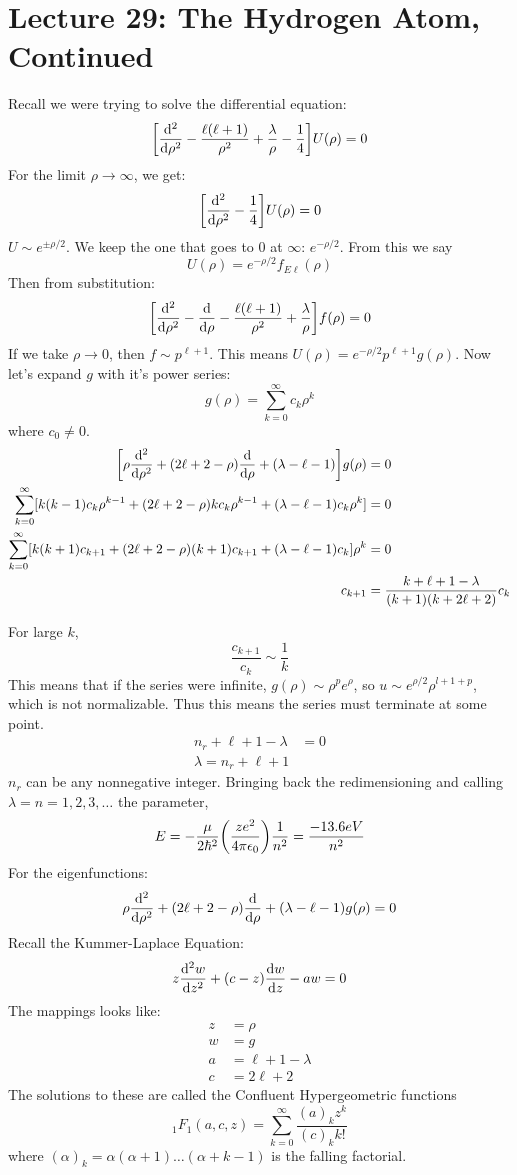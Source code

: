 \section{Lecture 29: The Hydrogen Atom, Continued}

Recall we were trying to solve the differential equation:
\[ \qty[\dv{^2}{\rho^2} - \frac{\ell(\ell + 1)}{\rho^2} + \frac{\lambda}{\rho} - \frac{1}{4}] U(\rho) = 0\]
For the limit $\rho \to \infty$, we get:
\[ \qty[\dv{^2}{\rho^2} - \frac{1}{4}] U(\rho) = 0 \]
$U \sim e^{\pm \rho/2}$. We keep the one that goes to 0 at $\infty$: $e^{-\rho /2}$. From this we say
\[ U(\rho) = e^{-\rho/2} f_{E\ell}(\rho) \]
Then from substitution:
\[ \qty[\dv{^2}{\rho^2} - \dv{}{\rho} - \frac{\ell(\ell + 1)}{\rho^2} + \frac{\lambda}{\rho}] f(\rho) = 0 \]
If we take $\rho \to 0$, then $f \sim p^{\ell + 1}$. This means $U(\rho) = e^{-\rho/2} p^{\ell + 1} g(\rho)$.
Now let's expand $g$ with it's power series:
\[ g(\rho) = \sum_{k = 0}^{\infty} c_k \rho^k \]
where $c_0 \neq 0$.
\begin{align*} 
    \qty[\rho \dv{^2}{\rho^2} + (2 \ell + 2 - \rho) \dv{}{\rho} + (\lambda - \ell - 1)]g(\rho) &= 0\\
    \sum_{k = 0}^{\infty} [k (k - 1) c_k \rho^{k - 1} + (2 \ell + 2 - \rho) k c_k \rho^{k - 1} + (\lambda - \ell - 1) c_k \rho^k] &= 0\\
    \sum_{k = 0}^{\infty} [ k(k + 1) c_{k + 1} + (2 \ell + 2 - \rho)(k + 1) c_{k + 1} + (\lambda - \ell - 1)c_k ]\rho^k &= 0 \\
    c_{k + 1} &= \frac{k + \ell + 1 - \lambda}{(k + 1) (k + 2\ell + 2)} c_k
\end{align*}

For large $k$,
\[ \frac{c_{k + 1}}{c_k} \sim \frac{1}{k} \]
This means that if the series were infinite, $g(\rho) \sim \rho^p e^{\rho}$, so $u \sim e^{\rho/2} \rho^{l + 1 + p}$,
which is not normalizable. Thus this means the series must terminate at some point.
\begin{align*}
    n_r + \ell + 1 - \lambda &= 0 \\
    \lambda = n_r + \ell + 1
\end{align*}
$n_r$ can be any nonnegative integer. Bringing back the redimensioning and calling $\lambda = n = 1, 2, 3, \dots$ the parameter,
\[ E = - \frac{\mu}{2\hbar^2} \qty(\frac{ze^2}{4\pi\epsilon_0}) \frac{1}{n^2} = \frac{-13.6 eV}{n^2} \]
For the eigenfunctions:
\[ \rho \dv{^2}{\rho^2} + (2 \ell + 2 - \rho) \dv{}{\rho} + (\lambda - \ell - 1) g(\rho) = 0 \]
Recall the Kummer-Laplace Equation:
\[ z \dv{^2w}{z^2} + (c - z) \dv{w}{z} - aw = 0 \]
The mappings looks like:
\begin{align*}
    z &= \rho \\
    w &= g \\
    a &= \ell + 1 - \lambda \\
    c &= 2 \ell + 2
\end{align*}
The solutions to these are called the Confluent Hypergeometric functions 
\[ _1F_1(a, c, z) = \sum_{k = 0}^{\infty} \frac{(a)_k z^k}{(c)_k k!}\]
where $(\alpha)_k = \alpha(\alpha + 1)\dots(\alpha + k - 1)$ is the falling factorial.

